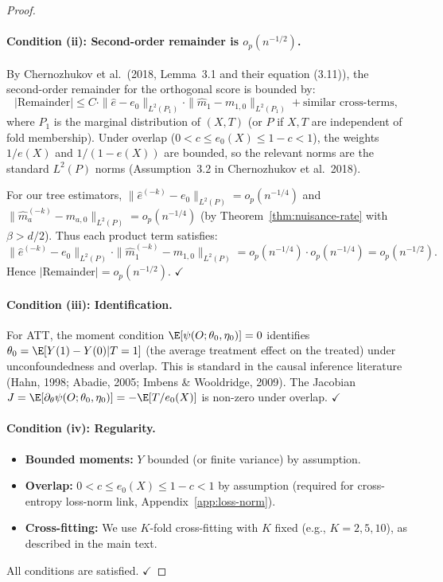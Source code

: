 \begin{proof}
\paragraph{Condition (ii): Second-order remainder is $o_p(n^{-1/2})$.}
By Chernozhukov et al.\ (2018, Lemma~3.1 and their equation (3.11)), the second-order remainder for the orthogonal score is bounded by:
\[
|\text{Remainder}| \le C \cdot \|\hat{e} - e_0\|_{L^2(P_1)} \cdot \|\hat{m}_1 - m_{1,0}\|_{L^2(P_1)} + \text{similar cross-terms},
\]
where $P_1$ is the marginal distribution of $(X, T)$ (or $P$ if $X, T$ are independent of fold membership). Under overlap ($0 < c \le e_0(X) \le 1-c < 1$), the weights $1/e(X)$ and $1/(1-e(X))$ are bounded, so the relevant norms are the standard $L^2(P)$ norms (Assumption~3.2 in Chernozhukov et al.\ 2018).

For our tree estimators, $\|\hat{e}^{(-k)} - e_0\|_{L^2(P)} = o_p(n^{-1/4})$ and $\|\hat{m}_a^{(-k)} - m_{a,0}\|_{L^2(P)} = o_p(n^{-1/4})$ (by Theorem~\ref{thm:nuisance-rate} with $\beta > d/2$). Thus each product term satisfies:
\[
\|\hat{e}^{(-k)} - e_0\|_{L^2(P)} \cdot \|\hat{m}_1^{(-k)} - m_{1,0}\|_{L^2(P)} = o_p(n^{-1/4}) \cdot o_p(n^{-1/4}) = o_p(n^{-1/2}).
\]
Hence $|\text{Remainder}| = o_p(n^{-1/2})$. $\checkmark$

\paragraph{Condition (iii): Identification.}
For ATT, the moment condition $\E[\psi(O; \theta_0, \eta_0)] = 0$ identifies $\theta_0 = \E[Y(1) - Y(0) | T = 1]$ (the average treatment effect on the treated) under unconfoundedness and overlap. This is standard in the causal inference literature (Hahn, 1998; Abadie, 2005; Imbens \& Wooldridge, 2009). The Jacobian $J = \E[\partial_\theta \psi(O; \theta_0, \eta_0)] = -\E[T/e_0(X)]$ is non-zero under overlap. $\checkmark$

\paragraph{Condition (iv): Regularity.}
\begin{itemize}
\item \textbf{Bounded moments:} $Y$ bounded (or finite variance) by assumption.
\item \textbf{Overlap:} $0 < c \le e_0(X) \le 1-c < 1$ by assumption (required for cross-entropy loss-norm link, Appendix~\ref{app:loss-norm}).
\item \textbf{Cross-fitting:} We use $K$-fold cross-fitting with $K$ fixed (e.g., $K = 2, 5, 10$), as described in the main text.
\end{itemize}
All conditions are satisfied. $\checkmark$


\end{proof}

